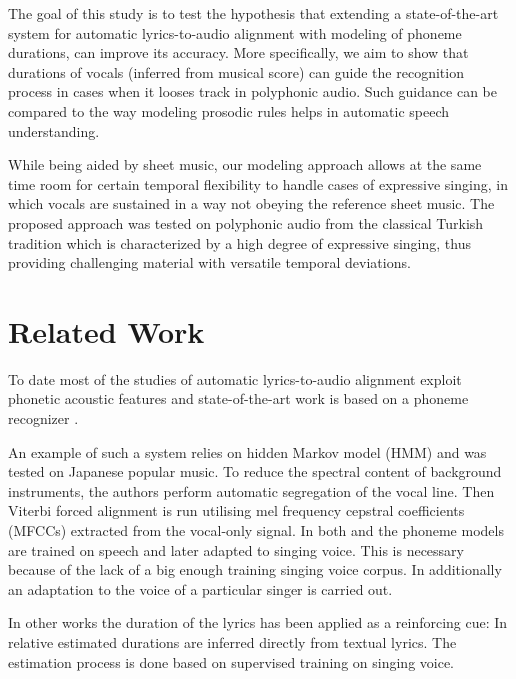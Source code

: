 \documentclass{article}
\begin{document}
The goal of this study is to test the hypothesis that extending a
state-of-the-art system for automatic lyrics-to-audio alignment with
modeling of phoneme durations, can improve its accuracy. More specifically,
we aim to show that durations of vocals (inferred from musical score)
can guide the recognition process in cases when it looses track in
polyphonic audio. Such guidance can be compared to the way modeling
prosodic rules helps in automatic speech understanding. 

While being aided by sheet music, our modeling approach allows at
the same time room for certain temporal flexibility to handle cases
of expressive singing, in which vocals are sustained in a way not
obeying the reference sheet music. The proposed approach was tested
on polyphonic audio from the classical Turkish tradition which is
characterized by a high degree of expressive singing, thus providing
challenging material with versatile temporal deviations.  


\section{Related Work}

To date most of the studies of automatic lyrics-to-audio alignment
exploit phonetic acoustic features and state-of-the-art work is based
on a phoneme recognizer \cite{fujihara2011lyricsynchronizer,Mesaros96automaticalignment}.

An example of such a system \cite{fujihara2011lyricsynchronizer}
relies on hidden Markov model (HMM) and was tested on Japanese popular
music. To reduce the spectral content of background instruments, the
authors perform automatic segregation of the vocal line. Then Viterbi
forced alignment \cite{rabiner1989tutorial} is run utilising mel
frequency cepstral coefficients (MFCCs) extracted from the vocal-only
signal. In both \cite{fujihara2011lyricsynchronizer} and \cite{Mesaros96automaticalignment}
the phoneme models are trained on speech and later adapted to singing
voice. This is necessary because of the lack of a big enough training
singing voice corpus. In \cite{fujihara2011lyricsynchronizer} additionally
an adaptation to the voice of a particular singer is carried out.


In other works the duration of the lyrics has been applied as a reinforcing
cue: In \cite{wang2004lyrically} relative estimated durations are
inferred directly from textual lyrics. The estimation process is done
based on supervised training on singing voice. 
\end{document}
